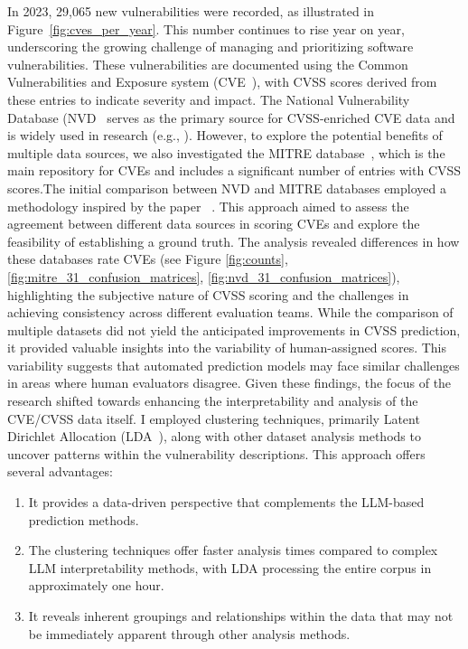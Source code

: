\documentclass[12pt]{article}
\begin{document}
In 2023, 29,065 new vulnerabilities were recorded, as illustrated in Figure~\ref{fig:cves_per_year}.
This number continues to rise year on year, underscoring the growing challenge of managing and
prioritizing software vulnerabilities. These vulnerabilities are documented using the Common
Vulnerabilities and Exposure system (CVE~\cite{CVE}), with CVSS scores derived from these entries to
indicate severity and impact. The National Vulnerability Database (NVD~\cite{NVD} serves as the
primary source for CVSS-enriched CVE data and is widely used in research (e.g., \cite{costa,
	nvd_example1, nvd_example2}). However, to explore the potential benefits of multiple data sources,
we also investigated the MITRE database~\cite{MITRE}, which is the main repository for CVEs and
includes a significant number of entries with CVSS scores.The initial comparison between NVD and
MITRE databases employed a methodology inspired by the paper ~\cite{bayes}. This approach aimed to assess the
agreement between different data sources in scoring CVEs and explore the feasibility of establishing
a ground truth. The analysis revealed differences in how these databases rate CVEs (see Figure
\ref{fig:counts}, \ref{fig:mitre_31_confusion_matrices}, \ref{fig:nvd_31_confusion_matrices}), highlighting the subjective nature of CVSS scoring and the challenges in
achieving consistency across different evaluation teams. While the comparison of multiple datasets
did not yield the anticipated improvements in CVSS prediction, it provided valuable insights into
the variability of human-assigned scores. This variability suggests that automated prediction models
may face similar challenges in areas where human evaluators disagree. Given these findings, the
focus of the research shifted towards enhancing the interpretability and analysis of the CVE/CVSS
data itself. I employed clustering techniques, primarily Latent Dirichlet Allocation
(LDA~\cite{lda_origin}), along with other dataset analysis methods to uncover patterns within the
vulnerability descriptions. This approach offers several advantages:

\begin{enumerate}

	\item It provides a data-driven perspective that complements the LLM-based prediction methods.

	\item The clustering techniques offer faster analysis times compared to complex LLM interpretability
	      methods, with LDA processing the entire corpus in approximately one hour.

	\item It reveals inherent groupings and relationships within the data that may not be immediately apparent
	      through other analysis methods.

\end{enumerate}
\end{document}
